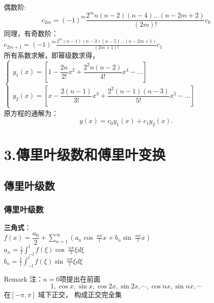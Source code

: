 \begin{frame}	
	偶数阶:
	\[c_{2m} = (-1) ^m \frac{2^mn(n-2)(n-4) ... (n-2m+2)  } {(2m)!} c_0\]
	同理，有奇数阶：\\
	{ $\displaystyle
		c_{2m+1} = (-1) ^m \frac{2^m (n-1) (n-3)(n-5)...(n-2m+1)  } {(2m+1)!} c_1$}\\ \vspace{0.3cm}
	所有系数求解，即幂级数求得，\\
	$\displaystyle \begin{cases}
		y_1(x)  = [1- \dfrac{2n}{2!} x^2+ \dfrac{2^2n(n-2)}{4!} x^4 -...  ] \\
		y_2(x)  = [x- \dfrac{2(n-1)}{3!} x^3+ \dfrac{2^2(n-1)(n-3) }{5!}x^5 -...  ]
	\end{cases}$ \\ \vspace{0.3cm}
	原方程的通解为：
	\begin{equation*}
		y(x) =c_0y_1(x)+c_1 y_2(x).
	\end{equation*}   
\end{frame}

\section{3.傳里叶级数和傅里叶变换}
\subsection{傳里叶级数 }

\begin{frame}
\frametitle{傳里叶级数}
	\textbf{\large 三角式}：\\
	{\large  $\displaystyle f(x) =\dfrac{a_0}{2} +\sum_{n=1}^{\infty}  \left(  a_n \cos~ \frac{n\pi}{l} x +  b_n \sin~ \frac{n\pi}{l} x  \right) $ }\\	
	{\large $\displaystyle a_n =\frac{1}{l}  \int_{-l}^{l}  f(\xi )   \cos~ \frac{n\pi}{l} \xi d\xi  $ }\\	
	{\large $\displaystyle b_n =\frac{1}{l}  \int_{-l}^{l}  f(\xi )   \sin~ \frac{n\pi}{l} \xi d\xi   $ }\\	\vspace{0.3em}
	
	\begin{block} {Remark}
	注：$n=0$项提出在前面 
	\[1,\cos x,\sin x, \cos2x,\sin2x, \cdots,\cos nx,\sin nx, \cdots\] 在$[-\pi, \pi]$ 域下正交，
	构成正交完全集
	\end{block}
\end{frame}

